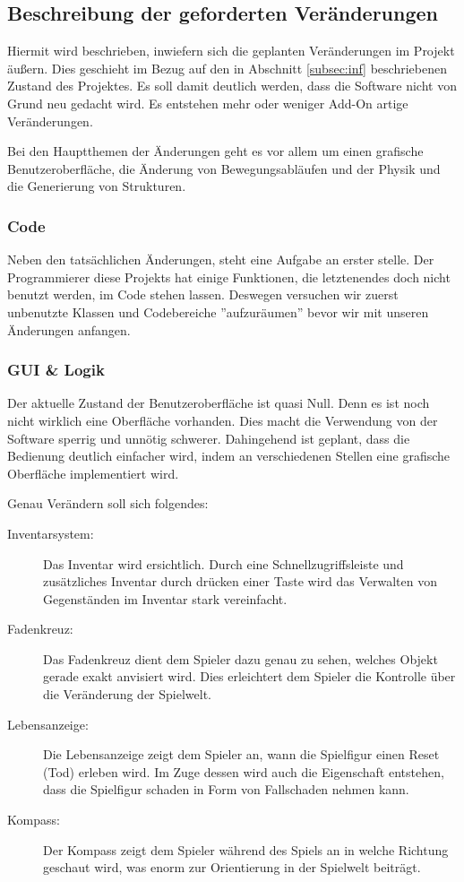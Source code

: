 \documentclass{article}
\begin{document}
\subsection{Beschreibung der geforderten Veränderungen} \label{subsec:desc_of_changes}

Hiermit wird beschrieben, inwiefern sich die geplanten Veränderungen im Projekt äußern. Dies geschieht im Bezug auf den in Abschnitt \ref{subsec:inf} beschriebenen Zustand des Projektes. Es soll damit deutlich werden, dass die Software nicht von Grund neu gedacht wird. Es entstehen mehr oder weniger Add-On artige Veränderungen.

Bei den Hauptthemen der Änderungen geht es vor allem um einen grafische Benutzeroberfläche, die Änderung von Bewegungsabläufen und der Physik und die Generierung von Strukturen.

\subsubsection{Code}

Neben den tatsächlichen Änderungen, steht eine Aufgabe an erster stelle. Der Programmierer diese Projekts hat einige Funktionen, die letztenendes doch nicht benutzt werden, im Code stehen lassen. Deswegen versuchen wir zuerst unbenutzte Klassen und Codebereiche ''aufzuräumen'' bevor wir mit unseren Änderungen anfangen.

\subsubsection{GUI \& Logik}

Der aktuelle Zustand der Benutzeroberfläche ist quasi Null. Denn es ist noch nicht wirklich eine Oberfläche vorhanden. Dies macht die Verwendung von der Software sperrig und unnötig schwerer. Dahingehend ist geplant, dass die Bedienung deutlich einfacher wird, indem an verschiedenen Stellen eine grafische Oberfläche implementiert wird.

Genau Verändern soll sich folgendes:

\begin{description}
  \item[Inventarsystem:] Das Inventar wird ersichtlich. Durch eine Schnellzugriffsleiste und zusätzliches Inventar durch drücken einer Taste wird das Verwalten von Gegenständen im Inventar stark vereinfacht.
  \item[Fadenkreuz:] Das Fadenkreuz dient dem Spieler dazu genau zu sehen, welches Objekt gerade exakt anvisiert wird. Dies erleichtert dem Spieler die Kontrolle über die Veränderung der Spielwelt.
  \item[Lebensanzeige:] Die Lebensanzeige zeigt dem Spieler an, wann die Spielfigur einen Reset (Tod) erleben wird. Im Zuge dessen wird auch die Eigenschaft entstehen, dass die Spielfigur schaden in Form von Fallschaden nehmen kann.
  \item[Kompass:] Der Kompass zeigt dem Spieler während des Spiels an in welche Richtung geschaut wird, was enorm zur Orientierung in der Spielwelt beiträgt.
\end{description}
\end{document}
